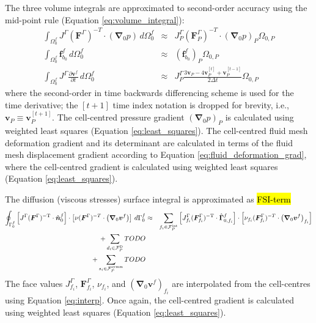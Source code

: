 \documentclass[sn-mathphys,Numbered]{sn-jnl}%
\newcommand{\bb}{\boldsymbol}
\begin{document}
The three volume integrals are approximated to second-order accuracy using the mid-point rule (Equation \ref{eq:volume_integral}):
\begin{eqnarray}
	\int_{\Omega^f_0} J^\Gamma (\bb{F}^\Gamma)^{-T} \cdot \left( \bb{\nabla}_0 p \right) \, d\Omega^f_0
		&\approx& J^\Gamma_P (\bb{F}^\Gamma_P)^{-T} \cdot \left( \bb{\nabla}_0 p \right)_P  \Omega_{0,P} \\
	\int_{\Omega^f_0} \bb{f}_{b_0}^f \, d\Omega^f_0	&\approx&		\left( \bb{f}_{b_0}^f \right)_P  \Omega_{0,P} \\
	\int_{\Omega^f_0} J^\Gamma \frac{\partial \bb{v}^f}{\partial t} \, d\Omega^f_0
		&\approx& 	J^\Gamma_P  \frac{3 \bb{v}_P - 4 \bb{v}_P^{[t]} + \bb{v}_P^{[t-1]}}{2\Delta t}  \Omega_{0,P}
\end{eqnarray}
where the second-order in time backwards differencing scheme is used for the time derivative;
the $[t+1]$ time index notation is dropped for brevity, i.e., $\bb{v}_P  \equiv \bb{v}_P^{[t+1]}$.
The cell-centred pressure gradient $\left( \bb{\nabla}_0 p \right)_P$ is calculated using weighted least squares (Equation \ref{eq:least_squares}).
The cell-centred fluid mesh deformation gradient and its determinant are calculated in terms of the fluid mesh displacement gradient according to Equation \ref{eq:fluid_deformation_grad}, where the cell-centred gradient is calculated using weighted least squares (Equation \ref{eq:least_squares}).

The diffusion (viscous stresses) surface integral is approximated as \hl{FSI-term}
\begin{eqnarray}
	\oint_{\Gamma^f_0}  \left[ J^\Gamma (\bb{F}^\Gamma)^{-\text{T}} \cdot \hat{\bb{n}}_0^f \right]
		\cdot \left[\nu (\bb{F}^\Gamma)^{-T} \cdot \left( \bb{\nabla}_0 \bb{v}^f \right) \right] \, d\Gamma^f_0
		&\approx&
		\sum_{f_i \in \mathcal{F}^{\text{int}}_P}
		\left[ J^\Gamma_{f_i} (\bb{F}^\Gamma_{f_i})^{-\text{T}} \cdot \hat{\bb{\Gamma}}_{0, f_i}^f \right]
			\cdot \left[\nu_{f_i} (\bb{F}^\Gamma_{f_i})^{-T} \cdot \left( \bb{\nabla}_0 \bb{v}^f \right)_{f_i} \right]
			\notag \\
		+ \sum_{d_i \in \mathcal{F}^{\text{D}}_P} TODO \notag \\
		+ \sum_{s_i \in \mathcal{F}^{\text{symm}}_P} TODO 
\end{eqnarray}
The face values $J^\Gamma_{f_i}$, $\bb{F}^\Gamma_{f_i}$, $\nu_{f_i}$, and $\left( \bb{\nabla}_0 \bb{v}^f \right)_{f_i} $ are interpolated from the cell-centres using Equation \ref{eq:interp}.
Once again, the cell-centred gradient is calculated using weighted least squares (Equation \ref{eq:least_squares}).
\end{document}
